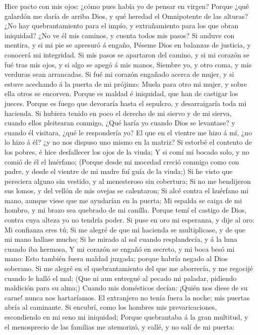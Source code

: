  Hice pacto con mis ojos: ¿cómo pues había yo de pensar en
virgen?  Porque ¿qué galardón me daría de arriba Dios, y
qué heredad el Omnipotente de las alturas?  ¿No hay
quebrantamiento para el impío, y extrañamiento para los que obran
iniquidad?  ¿No ve él mis caminos, y cuenta todos mis
pasos?  Si anduve con mentira, y si mi pie se apresuró á
engaño,  Péseme Dios en balanzas de justicia, y conocerá
mi integridad.  Si mis pasos se apartaron del camino, y si
mi corazón se fué tras mis ojos, y si algo se apegó á mis manos,
 Siembre yo, y otro coma, y mis verduras sean arrancadas.
 Si fué mi corazón engañado acerca de mujer, y si estuve
acechando á la puerta de mi prójimo:  Muela para otro mi
mujer, y sobre ella otros se encorven.  Porque es maldad
é iniquidad, que han de castigar los jueces.  Porque es
fuego que devoraría hasta el sepulcro, y desarraigaría toda mi hacienda.
 Si hubiera tenido en poco el derecho de mi siervo y de
mi sierva, cuando ellos pleitearan conmigo,  ¿Qué haría
yo cuando Dios se levantase? y cuando él visitara, ¿qué le respondería
yo?  El que en el vientre me hizo á mí, ¿no lo hizo á él?
¿y no nos dispuso uno mismo en la matriz?  Si estorbé el
contento de los pobres, é hice desfallecer los ojos de la viuda;
 Y si comí mi bocado solo, y no comió de él el huérfano;
 (Porque desde mi mocedad creció conmigo como con padre,
y desde el vientre de mi madre fuí guía de la viuda;)  Si
he visto que pereciera alguno sin vestido, y al menesteroso sin
cobertura;  Si no me bendijeron sus lomos, y del vellón
de mis ovejas se calentaron;  Si alcé contra el huérfano
mi mano, aunque viese que me ayudarían en la puerta;  Mi
espalda se caiga de mi hombro, y mi brazo sea quebrado de mi canilla.
 Porque temí el castigo de Dios, contra cuya alteza yo no
tendría poder.  Si puse en oro mi esperanza, y dije al
oro: Mi confianza eres tú;  Si me alegré de que mi
hacienda se multiplicase, y de que mi mano hallase mucho;
 Si he mirado al sol cuando resplandecía, y á la luna
cuando iba hermosa,  Y mi corazón se engañó en secreto, y
mi boca besó mi mano:  Esto también fuera maldad juzgada;
porque habría negado al Dios soberano.  Si me alegré en
el quebrantamiento del que me aborrecía, y me regocijé cuando le halló
el mal;  (Que ni aun entregué al pecado mi paladar,
pidiendo maldición para su alma;)  Cuando mis domésticos
decían: ¡Quién nos diese de su carne! nunca nos hartaríamos.
 El extranjero no tenía fuera la noche; mis puertas abría
al caminante.  Si encubrí, como los hombres mis
prevaricaciones, escondiendo en mi seno mi iniquidad; 
Porque quebrantaba á la gran multitud, y el menosprecio de las familias
me atemorizó, y callé, y no salí de mi puerta:

